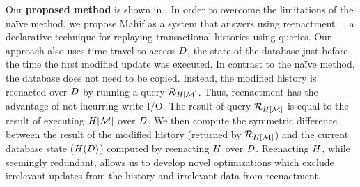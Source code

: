Our \textbf{proposed method} is shown in . In order to overcome the limitations of the naïve method, we propose Mahif as a system that answers \abbrHWs using reenactment~\cite{AG14,AG17,AG18}%
% 
, a declarative technique for replaying transactional histories using queries.
% 
Our approach also uses time travel to access $D$, the state of the database just before the time the first modified update was executed. In contrast to the naïve method, the database does not need to be copied. %
Instead, the modified history is reenacted over $D$ by running a query $\mathcal{R}_{H[\mathcal{M}]}$.
Thus, reenactment has the advantage of not incurring write I/O.
The result of query $\mathcal{R}_{H[\mathcal{M}]}$ is equal to the result of executing $H[\mathcal{M}]$ over $D$.  %
We then compute the symmetric difference between the result of the modified history (returned by $\mathcal{R}_{H[\mathcal{M}]}$) and the current database state ($H(D)$) computed by reenacting $H$ over $D$. Reenacting $H$, while seemingly redundant, allows us to develop novel optimizations which %
exclude irrelevant updates from the history and irrelevant data from reenactment. %

% 

